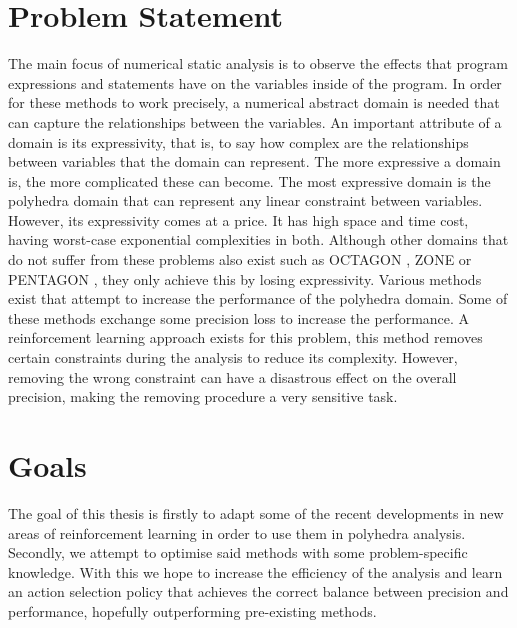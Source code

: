 \section{Problem Statement}
The main focus of numerical static analysis is to observe the effects that program expressions and statements have on the variables inside of the program. In order for these methods to work precisely, a numerical abstract domain is needed that can capture the relationships between the variables. An important attribute of a domain is its expressivity, that is, to say how complex are the relationships between variables that the domain can represent. The more expressive a domain is, the more complicated these can become. The most expressive domain is the polyhedra domain that can represent any linear constraint between variables. However, its expressivity comes at a price. It has high space and time cost, having worst-case exponential complexities in both. Although other domains that do not suffer from these problems also exist such as OCTAGON \cite{mine2006octagon}, ZONE \cite{mine2001new} or PENTAGON \cite{logozzo2010pentagons}, they only achieve this by losing expressivity. Various methods exist that attempt to increase the performance of the polyhedra domain. Some of these methods exchange some precision loss to increase the performance. A reinforcement learning approach exists for this problem, this method removes certain constraints during the analysis to reduce its complexity.  However, removing the wrong constraint can have a disastrous effect on the overall precision, making the removing procedure a very sensitive task.
\section{Goals}
The goal of this thesis is firstly to adapt some of the recent developments in new areas of reinforcement learning in order to use them in polyhedra analysis. Secondly, we attempt to optimise said methods with some problem-specific knowledge. With this we hope to increase the efficiency of the analysis and learn an action selection policy that achieves the correct balance between precision and performance, hopefully outperforming pre-existing methods. 

